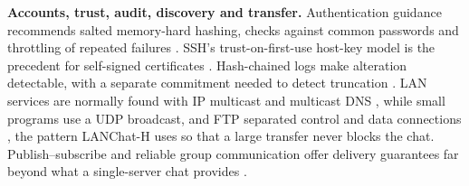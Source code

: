\documentclass[conference]{IEEEtran}
\begin{document}
\textbf{Accounts, trust, audit, discovery and transfer.} Authentication guidance recommends salted memory-hard hashing, checks against common passwords and throttling of repeated failures \cite{nist63b,rfc7914}. SSH's trust-on-first-use host-key model is the precedent for self-signed certificates \cite{rfc4251}. Hash-chained logs make alteration detectable, with a separate commitment needed to detect truncation \cite{schneier99,crosby09}. LAN services are normally found with IP multicast \cite{rfc1112} and multicast DNS \cite{rfc6762,rfc6763}, while small programs use a UDP broadcast, and FTP separated control and data connections \cite{rfc959}, the pattern LANChat-H uses so that a large transfer never blocks the chat. Publish--subscribe and reliable group communication offer delivery guarantees far beyond what a single-server chat provides \cite{eugster,birman87,birman93}.
\end{document}
